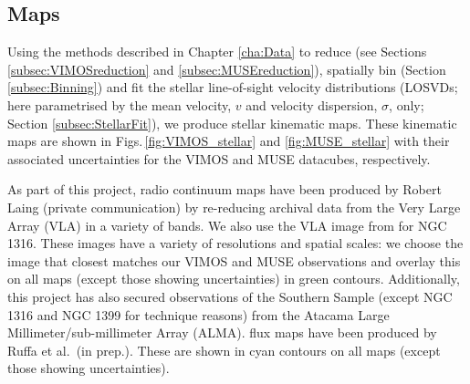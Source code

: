 	\subsection{Maps}
		\label{subsec:maps}
		Using the methods described in Chapter \ref{cha:Data} to reduce (see Sections \ref{subsec:VIMOSreduction} and \ref{subsec:MUSEreduction}), spatially bin (Section \ref{subsec:Binning}) and fit the stellar line-of-sight velocity distributions (LOSVDs; here parametrised by the mean velocity, $v$ and velocity dispersion, $\sigma$, only; Section \ref{subsec:StellarFit}), we produce stellar kinematic maps. These kinematic maps are shown in Figs.\,\ref{fig:VIMOS_stellar} and \ref{fig:MUSE_stellar} with their associated uncertainties for the VIMOS and MUSE datacubes, respectively. 

		As part of this project, radio continuum maps have been produced by Robert Laing (private communication) by re-reducing archival data from the Very Large Array (VLA) in a variety of bands. We also use the VLA image from \citet{Lanz2010} for NGC 1316. These images have a variety of resolutions and spatial scales: we choose the image that closest matches our VIMOS and MUSE observations and overlay this on all maps (except those showing uncertainties) in green contours. Additionally, this project has also secured observations of the Southern Sample (except NGC 1316 and NGC 1399 for technique reasons) from the Atacama Large Millimeter/sub-millimeter Array (ALMA).  flux maps have been produced by Ruffa et al.\ (in prep.). These are shown in cyan contours on all maps (except those showing uncertainties). 



